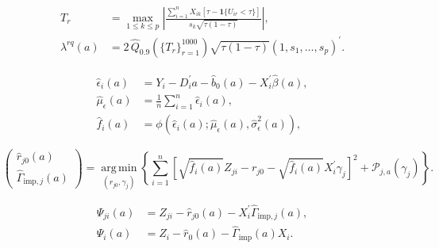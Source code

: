 \begin{equation}
    \begin{aligned}
        T_r
        &=
        \max_{1\leq k\leq p}
        \left|
            \frac{
                \sum_{i=1}^{n}X_{ik}
                \left[\tau-\mathbf{1}\{U_{ir}<\tau\}\right]
            }{
                s_k\sqrt{\tau(1-\tau)}
            }
        \right|,\\
        \lambda^{rq}(a)
        &=
        2\,\widehat Q_{0.9}\!\left(\{T_r\}_{r=1}^{1000}\right)
        \sqrt{\tau(1-\tau)}
        (1,s_1,\ldots,s_p)^{\prime}.
    \end{aligned}
    \label{eq:bc-pivotal-penalty}
\end{equation}

\begin{equation}
    \begin{aligned}
        \widehat{\epsilon}_i(a)
        &=
        Y_i-D_i^{\prime}a-\widehat b_0(a)
        -X_i^{\prime}\widehat{\beta}(a),\\
        \widehat{\mu}_{\epsilon}(a)
        &=\frac{1}{n}\sum_{i=1}^{n}\widehat{\epsilon}_i(a),\\
        \widehat f_i(a)
        &=
        \phi\!\left(
            \widehat{\epsilon}_i(a);
            \widehat{\mu}_{\epsilon}(a),
            \widehat{\sigma}_{\epsilon}^{2}(a)
        \right),
    \end{aligned}
    \label{eq:estimated-profile-residual}
\end{equation}

\begin{equation}
    \begin{pmatrix}
        \widehat r_{j0}(a)\\
        \widehat\Gamma_{\mathrm{imp},j}(a)
    \end{pmatrix}
    =
    \operatorname*{arg\,min}_{(r_{j0},\gamma_j)}
    \left\{
        \sum_{i=1}^{n}
        \left[
            \sqrt{\widehat f_i(a)}Z_{ji}
            -r_{j0}
            -\sqrt{\widehat f_i(a)}X_i^{\prime}\gamma_j
        \right]^2
        +\mathcal{P}_{j,a}(\gamma_j)
    \right\}.
    \label{eq:dml-residualization-implementation}
\end{equation}

\begin{equation}
    \begin{aligned}
        \widehat\Psi_{ji}(a)
        &=
        Z_{ji}-\widehat r_{j0}(a)-X_i^{\prime}\widehat\Gamma_{\mathrm{imp},j}(a),\\
        \widehat\Psi_i(a)
        &=
        Z_i-\widehat r_0(a)-\widehat\Gamma_{\mathrm{imp}}(a)X_i.
    \end{aligned}
    \label{eq:estimated-residualized-instrument}
\end{equation}

